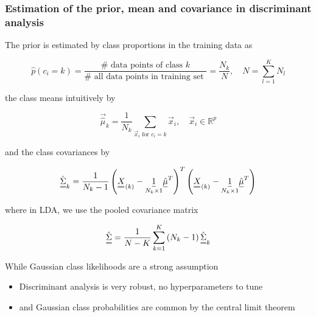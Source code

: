 \subsubsection{Estimation of the prior, mean and covariance in discriminant analysis}
The \textcolor{blue1}{prior} is estimated by class proportions in the training data as

\begin{equation}
    \hat{p}\left(c_i=k\right)=\frac{\# \text { data points of class } k}{\# \text { all data points in training set }}=\frac{N_k}{N}, \quad N=\sum_{l=1}^K N_l
\end{equation}

the \textcolor{blue1}{class means} intuitively by

\begin{equation}
    \vec{\hat{\mu}}_k=\frac{1}{N_k} \sum_{\vec{x}_i \text { for } c_i=k} \vec{x}_i, \quad \vec{x}_i \in \mathbb{R}^p
\end{equation}

and the \textcolor{blue1}{class covariances} by

\begin{equation}
    \mat{\hat{\Sigma}}_k=\frac{1}{N_k-1}\left(\mat{X}_{(k)}-\underset{N_k \times 1}{\vec{1}} \vec{\hat{\mu}}^T\right)^T\left(\mat{X}_{(k)}-\underset{N_k \times 1}{\vec{1}} \vec{\hat{\mu}}^T\right)
\end{equation}

where in LDA, we use the pooled covariance matrix

\begin{equation}
    \mat{\hat{\Sigma}}=\frac{1}{N-K}\sum_{k=1}^K \left(N_k-1\right) \mat{\hat{\Sigma}}_k
\end{equation}

While Gaussian class likelihoods are a strong assumption
\begin{itemize}
    \item Discriminant analysis is very robust, no hyperparameters to tune
    \item and Gaussian class probabilities are common by the central limit theorem
\end{itemize}

